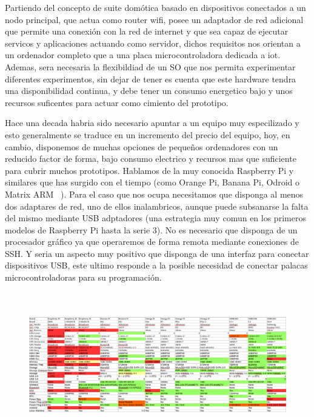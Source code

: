 Partiendo del concepto de suite domótica basado en dispositivos conectados a un nodo principal, que actua como router wifi, posee un adaptador de red adicional que permite una conexión con la red de internet y que sea capaz de ejecutar servicos y aplicaciones actuando como servidor, dichos requisitos nos orientan a un ordenador completo que a una placa microcontroladora dedicada a \gls{iot}. Ademas, sera necesaria la flexibildiad de un SO que nos permita experimentar diferentes experimentos, sin dejar de tener es cuenta que este hardware tendra una disponibilidad continua, y debe tener un consumo energetico bajo y unos recursos suficentes para actuar como cimiento del prototipo.

Hace una decada habria sido necesario apuntar a un equipo muy especilizado y esto generalmente se traduce en un incremento del precio del equipo, hoy, en cambio, disponemos de muchas opciones de pequeños ordenadores con un reducido factor de forma, bajo consumo electrico y recursos mas que suficiente para cubrir muchos prototipos. Hablamos de la muy conocida Raspberry Pi y similares que has surgido con el tiempo (como Orange Pi, Banana Pi, Odroid o Matrix ARM ~\cite{lignuxComparative}). Para el caso que nos ocupa necesitamos que disponga al menos dos adaptares de red, uno de ellos inalambricos, aunque puede subsanarse la falta del mismo mediante USB adptadores (una estrategia muy comun en los primeros modelos de Raspberry Pi hasta la serie 3). No es necesario que disponga de un procesador gráfico ya que operaremos de forma remota mediante conexiones de SSH. Y seria un aspecto muy positivo que disponga de una interfaz para conectar dispositivos USB, este ultimo responde a la posible necesidad de conectar palacas microcontroladoras para su programación.

\begin{figure}[hbt!]
\centering
\includegraphics[height=2.5in]{figures/comparativaOrdenadores.png}
\end{figure}


